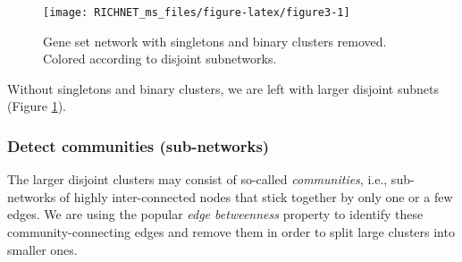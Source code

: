 \documentclass[9pt,a4paper,]{extarticle}
\newenvironment{Shaded}{\begin{snugshade}}{\end{snugshade}}
\newcommand{\KeywordTok}[1]{\textcolor[rgb]{0.13,0.29,0.53}{\textbf{#1}}}
\newcommand{\DataTypeTok}[1]{\textcolor[rgb]{0.13,0.29,0.53}{#1}}
\newcommand{\DecValTok}[1]{\textcolor[rgb]{0.00,0.00,0.81}{#1}}
\newcommand{\StringTok}[1]{\textcolor[rgb]{0.31,0.60,0.02}{#1}}
\newcommand{\OperatorTok}[1]{\textcolor[rgb]{0.81,0.36,0.00}{\textbf{#1}}}
\newcommand{\NormalTok}[1]{#1}
\begin{document}
\begin{Shaded}
\end{Shaded}

\begin{figure}

{\centering \texttt{[image: RICHNET\_ms\_files/figure-latex/figure3-1]} 

}

\caption{Gene set network with singletons and binary clusters removed. Colored according to disjoint subnetworks.}\label{fig:figure3}
\end{figure}

Without singletons and binary clusters, we are left with larger disjoint subnets (Figure \ref{fig:figure3}).

\subsubsection{Detect communities (sub-networks)}\label{detect-communities-sub-networks}

The larger disjoint clusters may consist of so-called \emph{communities}, i.e., sub-networks of highly inter-connected nodes that stick together by only one or a few edges. We are using the popular \emph{edge betweenness} property to identify these community-connecting edges and remove them in order to split large clusters into smaller ones.
\end{document}
